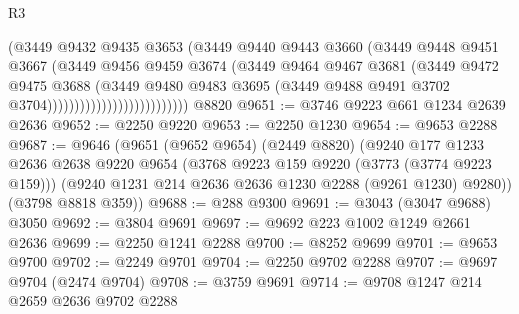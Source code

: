 \begin{lexlean}{R3}
\begin{coremodule}
                                        (@3449
                                          @9432
                                          @9435
                                          @3653
                                          (@3449
                                            @9440
                                            @9443
                                            @3660
                                            (@3449
                                              @9448
                                              @9451
                                              @3667
                                              (@3449
                                                @9456
                                                @9459
                                                @3674
                                                (@3449
                                                  @9464
                                                  @9467
                                                  @3681
                                                  (@3449
                                                    @9472
                                                    @9475
                                                    @3688
                                                    (@3449
                                                      @9480
                                                      @9483
                                                      @3695
                                                      (@3449
                                                        @9488
                                                        @9491
                                                        @3702
                                                        @3704))))))))))))))))))))))))))
    @8820
@9651 := @3746 @9223 @661 @1234 @2639 @2636
@9652 := @2250 @9220
@9653 := @2250 @1230
@9654 := @9653 @2288
@9687 := @9646
    (@9651
      (@9652 @9654)
      (@2449 @8820)
      (@9240
        @177
        @1233
        @2636
        @2638
        @9220
        @9654
        (@3768 @9223 @159 @9220 (@3773 (@3774 @9223 @159)))
        (@9240 @1231 @214 @2636 @2636 @1230 @2288 (@9261 @1230) @9280))
      (@3798 @8818 @359))
@9688 := @288 @9300
@9691 := @3043 (@3047 @9688) @3050
@9692 := @3804 @9691
@9697 := @9692 @223 @1002 @1249 @2661 @2636
@9699 := @2250 @1241 @2288
@9700 := @8252 @9699
@9701 := @9653 @9700
@9702 := @2249 @9701
@9704 := @2250 @9702 @2288
@9707 := @9697 @9704 (@2474 @9704)
@9708 := @3759 @9691
@9714 := @9708 @1247 @214 @2659 @2636 @9702 @2288

\end{coremodule}
\end{lexlean}
